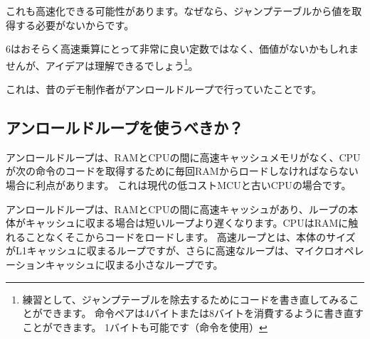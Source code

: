 これも高速化できる可能性があります。なぜなら、ジャンプテーブルから値を取得する必要がないからです。

6はおそらく高速乗算にとって非常に良い定数ではなく、価値がないかもしれませんが、アイデアは理解できるでしょう\footnote{練習として、ジャンプテーブルを除去するためにコードを書き直してみることができます。
命令ペアは4バイトまたは8バイトを消費するように書き直すことができます。
1バイトも可能です（命令を使用）}。

これは、昔のデモ制作者がアンロールドループで行っていたことです。

\subsection{アンロールドループを使うべきか？}

アンロールドループは、\ac{RAM}と\ac{CPU}の間に高速キャッシュメモリがなく、\ac{CPU}が次の命令のコードを取得するために毎回\ac{RAM}からロードしなければならない場合に利点があります。
これは現代の低コスト\ac{MCU}と古い\ac{CPU}の場合です。

アンロールドループは、\ac{RAM}と\ac{CPU}の間に高速キャッシュがあり、ループの本体がキャッシュに収まる場合は短いループより遅くなります。\ac{CPU}は\ac{RAM}に触れることなくそこからコードをロードします。
高速ループとは、本体のサイズがL1キャッシュに収まるループですが、さらに高速なループは、マイクロオペレーションキャッシュに収まる小さなループです。